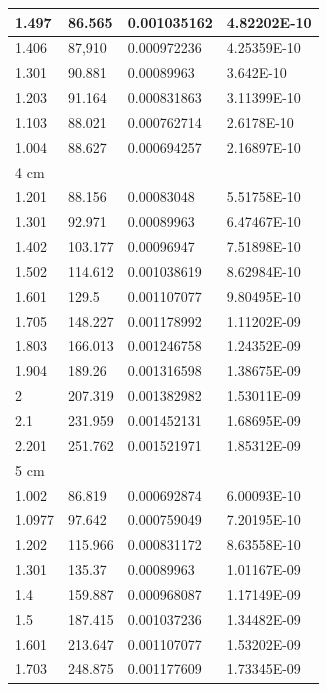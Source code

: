 \documentclass{article}
\begin{document}
\begin{longtable}{|l|l|l|l|}
        1.497 & 86.565 & 0.001035162 & 4.82202E-10 \\ \hline
        1.406 & 87,910 & 0.000972236 & 4.25359E-10 \\ \hline
        1.301 & 90.881 & 0.00089963 & 3.642E-10 \\ \hline
        1.203 & 91.164 & 0.000831863 & 3.11399E-10 \\ \hline
        1.103 & 88.021 & 0.000762714 & 2.6178E-10 \\ \hline
        1.004 & 88.627 & 0.000694257 & 2.16897E-10 \\ \hline
        4 cm & ~ & ~ & ~ \\ \hline
        1.201 & 88.156 & 0.00083048 & 5.51758E-10 \\ \hline
        1.301 & 92.971 & 0.00089963 & 6.47467E-10 \\ \hline
        1.402 & 103.177 & 0.00096947 & 7.51898E-10 \\ \hline
        1.502 & 114.612 & 0.001038619 & 8.62984E-10 \\ \hline
        1.601 & 129.5 & 0.001107077 & 9.80495E-10 \\ \hline
        1.705 & 148.227 & 0.001178992 & 1.11202E-09 \\ \hline
        1.803 & 166.013 & 0.001246758 & 1.24352E-09 \\ \hline
        1.904 & 189.26 & 0.001316598 & 1.38675E-09 \\ \hline
        2 & 207.319 & 0.001382982 & 1.53011E-09 \\ \hline
        2.1 & 231.959 & 0.001452131 & 1.68695E-09 \\ \hline
        2.201 & 251.762 & 0.001521971 & 1.85312E-09 \\ \hline
        5 cm & ~ & ~ & ~ \\ \hline
        1.002 & 86.819 & 0.000692874 & 6.00093E-10 \\ \hline
        1.0977 & 97.642 & 0.000759049 & 7.20195E-10 \\ \hline
        1.202 & 115.966 & 0.000831172 & 8.63558E-10 \\ \hline
        1.301 & 135.37 & 0.00089963 & 1.01167E-09 \\ \hline
        1.4 & 159.887 & 0.000968087 & 1.17149E-09 \\ \hline
        1.5 & 187.415 & 0.001037236 & 1.34482E-09 \\ \hline
        1.601 & 213.647 & 0.001107077 & 1.53202E-09 \\ \hline
        1.703 & 248.875 & 0.001177609 & 1.73345E-09 \\ \hline
    \end{longtable}
\end{document}
